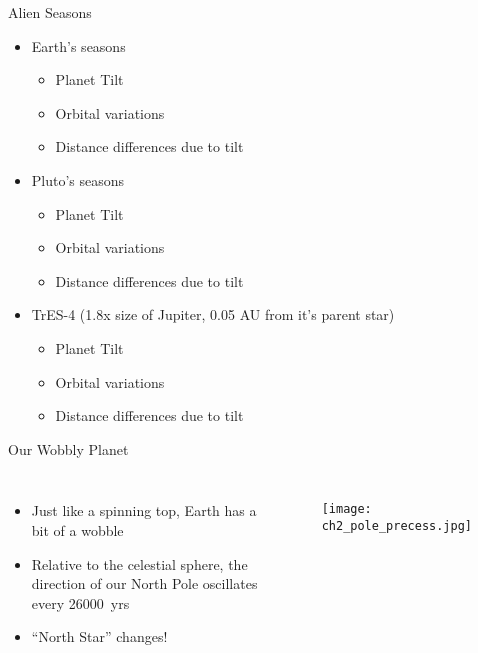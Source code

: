 \documentclass[pdf, aspectratio=169]{beamer}
\begin{document}
\begin{frame}{Alien Seasons}
  \begin{itemize}
	\item Earth's seasons
	  \begin{itemize}
		\item \alert{Planet Tilt}
		\item Orbital variations
		\item Distance differences due to tilt
	  \end{itemize}
	\item Pluto's seasons
	  \begin{itemize}
		\item Planet Tilt
		\item \alert{Orbital variations}
		\item Distance differences due to tilt
	  \end{itemize}
	\item TrES-4 (1.8x size of Jupiter, 0.05 AU from it's parent star)
	  \begin{itemize}
		\item Planet Tilt
		\item Orbital variations
		\item \alert{Distance differences due to tilt}
	  \end{itemize}
  \end{itemize}
\end{frame}

\begin{frame}{Our Wobbly Planet}
  \begin{columns}
	\begin{itemize}
	  \item Just like a spinning top, Earth has a bit of a wobble
	  \item Relative to the celestial sphere, the direction of our North Pole oscillates every \SI{26000}{yrs}
	  \item ``North Star'' changes!
	\end{itemize}
	\begin{figure}[h!]
	  \centering
	  \texttt{[image: ch2\_pole\_precess.jpg]}
	\end{figure}
  \end{columns}
\end{frame}

\end{document}
